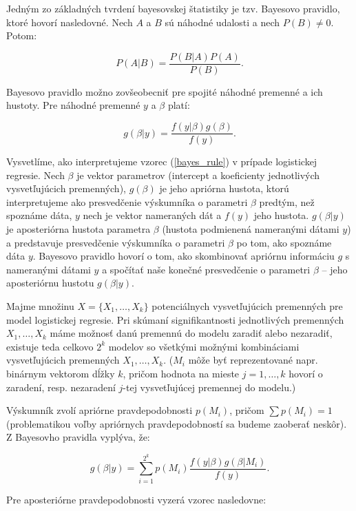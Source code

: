 Jedným zo základných tvrdení bayesovskej štatistiky je tzv. Bayesovo pravidlo, ktoré hovorí nasledovné.
Nech \(A\) a \(B\) sú náhodné udalosti a nech \(P(B) \neq 0\). Potom:

\[
P(A|B) = \frac{P(B|A) P(A)}{P(B)}.
\]

Bayesovo pravidlo možno zovšeobecniť pre spojité náhodné premenné a ich hustoty. Pre náhodné premenné \(y\) a \( \beta \) platí:

\begin{equation} \label{bayes_rule}
    g(\beta | y) = \frac{f(y | \beta) g(\beta)}{f(y)}.
\end{equation}

Vysvetlíme, ako interpretujeme vzorec (\ref{bayes_rule}) v prípade logistickej regresie.
Nech \( \beta \) je vektor parametrov (intercept a koeficienty jednotlivých vysvetľujúcich premenných),
\( g(\beta) \) je jeho apriórna hustota, ktorú interpretujeme ako presvedčenie výskumníka o parametri \( \beta \) predtým, než spoznáme dáta,
\( y \) nech je vektor nameraných dát a \( f(y) \) jeho hustota.
\( g(\beta | y) \) je aposteriórna hustota parametra \( \beta \) (hustota podmienená nameranými dátami \( y \)) a predstavuje presvedčenie výskumníka o parametri \( \beta \) po tom, ako spoznáme dáta \( y \).
Bayesovo pravidlo hovorí o tom, ako skombinovať apriórnu informáciu \( g \) s nameranými dátami \( y \) a spočítať naše konečné presvedčenie o parametri \( \beta \) – jeho aposteriórnu hustotu \( g(\beta|y) \).

Majme množinu \( X = \{X_1, \ldots,  X_k\} \) potenciálnych vysvetľujúcich premenných pre model logistickej regresie.
Pri skúmaní signifikantnosti jednotlivých premenných \( X_1, \ldots, X_k \) máme možnosť danú premennú do modelu zaradiť alebo nezaradiť,
existuje teda celkovo \( 2^k \) modelov so všetkými možnými kombináciami vysvetľujúcich premenných \( X_1, \ldots, X_k \).
(\( M_i \) môže byť reprezentované napr. binárnym vektorom dĺžky \(k\), pričom hodnota na mieste \( j = 1, \ldots, k \) hovorí o zaradení, resp. nezaradení \(j\)-tej vysvetľujúcej premennej do modelu.)

Výskumník zvolí apriórne pravdepodobnosti \( p(M_i) \), pričom \( \sum p(M_i) = 1 \) (problematikou voľby apriórnych pravdepodobností sa budeme zaoberať neskôr).
Z Bayesovho pravidla vyplýva, že:

\[
    g(\beta | y) = \sum_{i = 1}^{2^k} p(M_i) \frac{f(y | \beta) g(\beta | M_i)}{f(y)}.
\]

Pre aposteriórne pravdepodobnosti vyzerá vzorec nasledovne:

